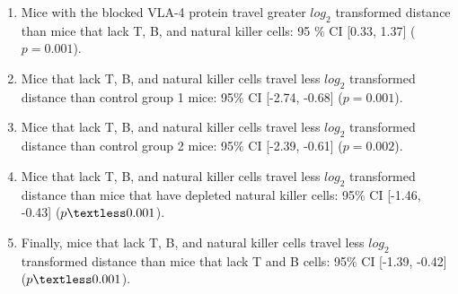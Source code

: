 \documentclass{article}\usepackage[]{graphicx}\usepackage[]{xcolor}
\begin{document}
\begin{enumerate}

\item{Mice with the blocked VLA-4 protein travel greater $log_{2}$ transformed distance than mice that lack T, B, and natural killer cells: 95 $\%$ CI [0.33, 1.37] ($p = 0.001$).}

\item{Mice that lack T, B, and natural killer cells travel less $log_{2}$ transformed distance than control group 1 mice: 95$\%$ CI [-2.74, -0.68] ($p = 0.001$).}

\item{Mice that lack T, B, and natural killer cells travel less $log_{2}$ transformed distance than control group 2 mice: 95$\%$ CI [-2.39, -0.61] ($p = 0.002$).}

\item{Mice that lack T, B, and natural killer cells travel less $log_{2}$ transformed distance than mice that have depleted natural killer cells: 95$\%$ CI [-1.46, -0.43] ($p \textless 0.001$).}

\item{Finally, mice that lack T, B, and natural killer cells travel less $log_{2}$ transformed distance than mice that lack T and B cells: 95$\%$ CI [-1.39, -0.42] ($p \textless 0.001$).}

\end{enumerate}



\end{document}
